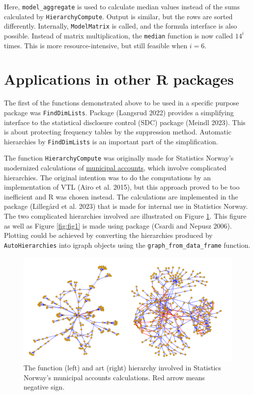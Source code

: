 Here, \texttt{model\_aggregate} is used to calculate median values instead of the sums calculated by \texttt{HierarchyCompute}.
Output is similar, but the rows are sorted differently.
Internally, \texttt{ModelMatrix} is called, and the formula interface is also possible.
Instead of matrix multiplication, the \texttt{median} function is now called \(14^i\) times.
This is more resource-intensive, but still feasible when \(i=6\).

\hypertarget{applications-in-other-r-packages}{%
\section{Applications in other R packages}\label{applications-in-other-r-packages}}

The first of the functions demonstrated above to be used in a specific purpose package was \texttt{FindDimLists}.
Package  (Langsrud 2022) provides a simplifying interface to the
statistical disclosure control (SDC) package  (Meindl 2023).
This is about protecting frequency tables by the suppression method.
Automatic hierarchies by \texttt{FindDimLists} is an important part of the simplification.

The function \texttt{HierarchyCompute} was originally made for Statistics Norway's modernized calculations
of \href{https://www.ssb.no/en/kommregnko/}{municipal accounts}, which involve complicated hierarchies.
The original intention was to do the computations by an implementation of VTL (Airo et al. 2015), but this approach proved to be too inefficient and R was chosen instead.
The calculations are implemented in the package  (Lillegård et al. 2023) that is made for internal use in Statistics Norway.
The two complicated hierarchies involved are illustrated on Figure \ref{fig:fig2}.
This figure as well as Figure \ref{fig:fig1} is made using package  (Csardi and Nepusz 2006).
Plotting could be achieved by converting the hierarchies produced by \texttt{AutoHierarchies} into igraph objects using the \texttt{graph\_from\_data\_frame} function.

\begin{figure}
\includegraphics[width=1\linewidth]{figures/Function_Art_hierarchy} \caption{The function (left) and art (right) hierarchy involved in Statistics Norway’s municipal accounts calculations. Red arrow means negative sign.}\label{fig:fig2}
\end{figure}

